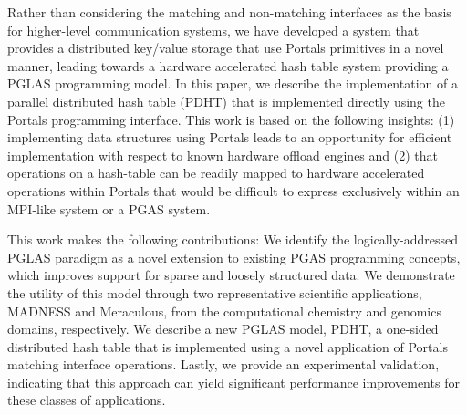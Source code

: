 Rather than considering the matching and non-matching interfaces as
the basis for higher-level communication systems, we have developed a
system that provides a distributed key/value storage that use Portals
primitives in a novel manner, leading towards a hardware accelerated
hash table system providing a PGLAS programming model. In this paper, we describe the implementation of a
parallel distributed hash table (PDHT) that is implemented directly
using the Portals programming interface. This work is based on the
following insights: (1) implementing data structures using Portals
leads to an opportunity for efficient implementation with respect to
known hardware offload engines and (2) that operations on a hash-table
can be readily mapped to hardware accelerated operations within
Portals that would be difficult to express exclusively within an
MPI-like system or a PGAS system.

This work makes the following contributions: We identify the
logically-addressed PGLAS paradigm as a novel extension to existing PGAS
programming concepts, which improves support for sparse and loosely structured
data.  We demonstrate the utility of this model through two representative
scientific applications, MADNESS and Meraculous, from the computational
chemistry and genomics domains, respectively.  We describe a new PGLAS model,
PDHT, a one-sided distributed hash table that is implemented using a novel
application of Portals matching interface operations. Lastly, we provide an
experimental validation, indicating that this approach can yield significant
performance improvements for these classes of applications.





